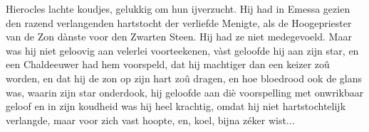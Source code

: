 \documentclass[a4paper, 12pt, oneside, dutch]{article}
\begin{document}
Hierocles lachte koudjes, gelukkig om hun ijverzucht. Hij had in Emessa gezien den razend verlangenden hartstocht der verliefde Menigte, als de Hoogepriester van de Zon dànste voor den Zwarten Steen. Hij had ze niet medegevoeld. Maar was hij niet geloovig aan velerlei voorteekenen, vàst geloofde hij aan zijn star, en een Chaldeeuwer had hem voorspeld, dat hij machtiger dan een keizer zoû worden, en dat hij de zon op zijn hart zoû dragen, en hoe bloedrood ook de glans was, waarin zijn star onderdook, hij geloofde aan diè voorspelling met onwrikbaar geloof en in zijn koudheid was hij heel krachtig, omdat hij niet hartstochtelijk verlangde, maar voor zich vast hoopte, en, koel, bijna zéker wist...

\subsection{}
\end{document}
